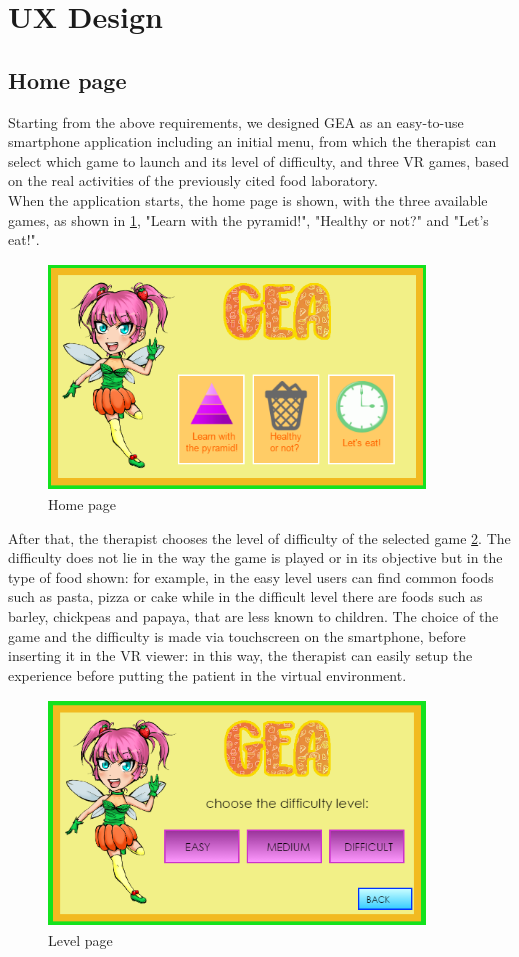 \section{UX Design}
\subsection{Home page}
Starting from the above requirements, we designed GEA as an easy-to-use smartphone application including an initial menu, from which the therapist can select which game to launch and its level of difficulty, and three VR games, based on the real activities of the previously cited food laboratory.\\
When the application starts, the home page is shown, with the three available games, as shown in \ref{fig:home}, "Learn with the pyramid!", "Healthy or not?" and "Let's eat!". \\
\begin{figure}[H]
\centering
\includegraphics[width=10cm, height=6cm]{immagini/Game.png}
\caption{Home page}\label{fig:home}
\end{figure}
After that, the therapist chooses the level of difficulty of the selected game \ref{fig:level}. The difficulty does not lie in the way the game is played or in its objective but in the type of food shown: for example, in the easy level users can find common foods such as pasta, pizza or cake while in the difficult level there are foods such as barley, chickpeas and papaya, that are less known to children. The choice of the game and the difficulty is made via touchscreen on the smartphone, before inserting it in the VR viewer: in this way, the therapist can easily setup the experience before putting the patient in the virtual environment.\\
\begin{figure}[H]
\centering
\includegraphics[width=10cm, height=6cm]{immagini/Level.png}
\caption{Level page}\label{fig:level}
\end{figure}
